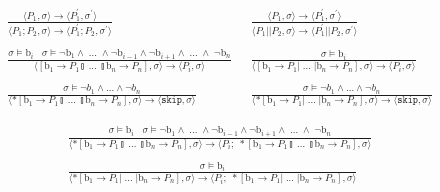 \documentclass[times,10pt]{article}
\begin{document}
\begin{align*}
\frac{\langle P_1, \sigma\rangle \rightarrow \langle P_1^\prime, \sigma^\prime\rangle }{\langle P_1; P_2, \sigma\rangle \rightarrow \langle P_1^\prime; P_2, \sigma^\prime\rangle} &
\;\; \frac{\langle P_1, \sigma\rangle \rightarrow \langle P_1^\prime, \sigma^\prime\rangle}{\langle P_1 || P_2, \sigma\rangle \rightarrow \langle P_1^\prime || P_2, \sigma^\prime\rangle} \\ \\
\frac{\sigma \models \textrm{b}_i \;\;\; \sigma \models \lnot \mathrm{b}_1 \wedge \; ... \; \wedge \lnot \mathrm{b}_{i-1} \wedge \lnot \mathrm{b}_{i+1} \wedge \; ... \; \wedge \; \lnot\mathrm{b}_n } {\langle [ \mathrm{b}_1 \rightarrow P_1  \talloblong \; ... \; \talloblong \mathrm{b}_n \rightarrow P_n ] , \sigma \rangle \rightarrow \langle P_i , \sigma\rangle  } &\;\;
 \frac{\sigma \models \textrm{b}_i} {\langle [ \mathrm{b}_1 \rightarrow P_1  | \; ... \; | \mathrm{b}_n \rightarrow P_n ] , \sigma \rangle \rightarrow \langle P_i , \sigma\rangle  } \\ \\
\frac{\sigma \models \lnot b_1 \wedge ... \wedge \lnot b_n}{\langle *[ \mathrm{b}_1 \rightarrow P_1  \talloblong \; ... \; \talloblong \mathrm{b}_n \rightarrow P_n ] , \sigma \rangle \rightarrow \langle \mathtt{skip} , \sigma\rangle } &\;\; 
\frac{\sigma \models \lnot b_1 \wedge ... \wedge \lnot b_n}{\langle *[ \mathrm{b}_1 \rightarrow P_1  | \; ... \; | \mathrm{b}_n \rightarrow P_n ] , \sigma \rangle \rightarrow \langle \mathtt{skip} , \sigma \rangle } 
\end{align*}

\begin{align*}
\frac{\sigma \models \textrm{b}_i \;\;\; \sigma \models \lnot \mathrm{b}_1 \wedge \; ... \; \wedge \lnot \mathrm{b}_{i-1} \wedge \lnot \mathrm{b}_{i+1} \wedge \; ... \; \wedge \; \lnot\mathrm{b}_n } {\langle *[ \mathrm{b}_1 \rightarrow P_1  \talloblong \; ... \; \talloblong \mathrm{b}_n \rightarrow P_n ] , \sigma \rangle \rightarrow \langle P_i; \; *[ \mathrm{b}_1 \rightarrow P_1  \talloblong \; ... \; \talloblong \mathrm{b}_n \rightarrow P_n ] , \sigma\rangle  } \\
\\ \frac{\sigma \models \textrm{b}_i} {\langle *[ \mathrm{b}_1 \rightarrow P_1  | \; ... \; | \mathrm{b}_n \rightarrow P_n ] , \sigma \rangle \rightarrow \langle P_i;\;*[ \mathrm{b}_1 \rightarrow P_1  | \; ... \; | \mathrm{b}_n \rightarrow P_n ] , \sigma\rangle  }
\end{align*}
\end{document}
